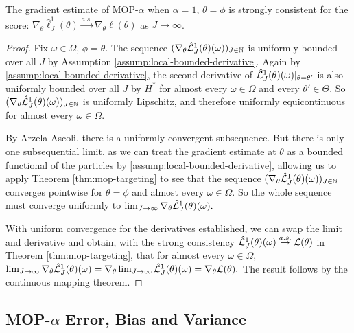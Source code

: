 \documentclass[9pt,twocolumn,pnasresearcharticle]{pnas-new}
\newcommand\arxiv[2]{#2} %
\begin{document}
\begin{thm}
    The gradient estimate of MOP-$\alpha$ when $\alpha=1$, $\theta=\phi$ is strongly consistent for the score: $\nabla_\theta \hat\ell_J^1(\theta) \stackrel{a.s.}{\to} \nabla_\theta \ell(\theta)$ as $J \to \infty$.
    \label{thm:mop-grad-consistency}
\end{thm}
\begin{proof}
    Fix $\omega \in \Omega$, $\phi = \theta$. The sequence $(\nabla_\theta \hat{\mathcal{L}}_J^1(\theta)(\omega))_{J \in \mathbb{N}}$ is uniformly bounded over all $J$ by Assumption \ref{assump:local-bounded-derivative}. Again by \ref{assump:local-bounded-derivative}, the second derivative of $\hat{\mathcal{L}}_J^1(\theta)(\omega)|_{\theta=\theta'}$ is also uniformly bounded over all $J$ by $H^*$ for almost every $\omega\in \Omega$ and every $\theta'\in \Theta$. So $(\nabla_\theta \hat{\mathcal{L}}_J^1(\theta)( \omega))_{J \in \mathbb{N}}$ is uniformly Lipschitz, and therefore uniformly equicontinuous for almost every $\omega \in \Omega$.

    By Arzela-Ascoli, there is a uniformly convergent subsequence. But there is only one subsequential limit, as we can treat the gradient estimate at $\theta$ as a bounded functional of the particles by \ref{assump:local-bounded-derivative}, allowing us to apply Theorem \ref{thm:mop-targeting} to see that the sequence $(\nabla_\theta \hat{\mathcal{L}}_J^1(\theta)(\omega))_{J \in \mathbb{N}}$ converges pointwise for $\theta=\phi$ and almost every $\omega \in \Omega$. So the whole sequence must converge uniformly to $\lim_{J \to \infty} \nabla_\theta \hat{\mathcal{L}}_J^1(\theta)(\omega).$ 
    
    With uniform convergence for the derivatives established, we can swap the limit and derivative and obtain, with the strong consistency $\hat{\mathcal{L}}_J^1(\theta)(\omega) \stackrel{a.s.}{\to} \mathcal{L}(\theta)$ in Theorem \ref{thm:mop-targeting}, that for almost every $\omega \in \Omega$, 
    $\lim_{J \to \infty} \nabla_\theta \hat{\mathcal{L}}_J^1(\theta)(\omega) = \nabla_\theta \lim_{J \to \infty} \hat{\mathcal{L}}_J^1(\theta)(\omega) = \nabla_\theta \mathcal{L}(\theta).$
    The result follows by the continuous mapping theorem. 
\end{proof}

\arxiv{}{\vspace*{-2mm}}
\subsection{MOP-$\alpha$ Error, Bias and Variance}
\end{document}
